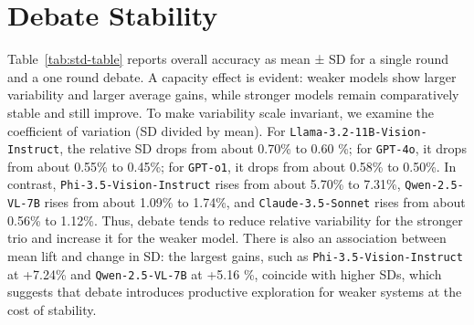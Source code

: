 \documentclass[11pt]{article}
\newcommand{\llamaname}{Llama-3.2-11B-Vision-Instruct}
\newcommand{\Qwenname}{Qwen-2.5-VL-7B}
\newcommand{\phiname}{Phi-3.5-Vision-Instruct}
\begin{document}


\section{Debate Stability}
\label{app:ave-stability}

Table~\ref{tab:std-table} reports overall accuracy as mean ± SD for a single round and a one round debate. A capacity effect is evident: weaker models show larger variability and larger average gains, while stronger models remain comparatively stable and still improve. To make variability scale invariant, we examine the coefficient of variation (SD divided by mean). For \texttt{\llamaname}, the relative SD drops from about 0.70\% to 0.60 \%; for \texttt{GPT-4o}, it drops from about 0.55\% to 0.45\%; for \texttt{GPT-o1}, it drops from about 0.58\% to 0.50\%. In contrast, \texttt{\phiname} rises from about 5.70\% to 7.31\%, \texttt{\Qwenname} rises from about 1.09\% to 1.74\%, and \texttt{Claude-3.5-Sonnet} rises from about 0.56\% to 1.12\%. Thus, debate tends to reduce relative variability for the stronger trio and increase it for the weaker model. There is also an association between mean lift and change in SD: the largest gains, such as \texttt{\phiname} at +7.24\% and \texttt{\Qwenname} at +5.16 \%, coincide with higher SDs, which suggests that debate introduces productive exploration for weaker systems at the cost of stability.
\end{document}
